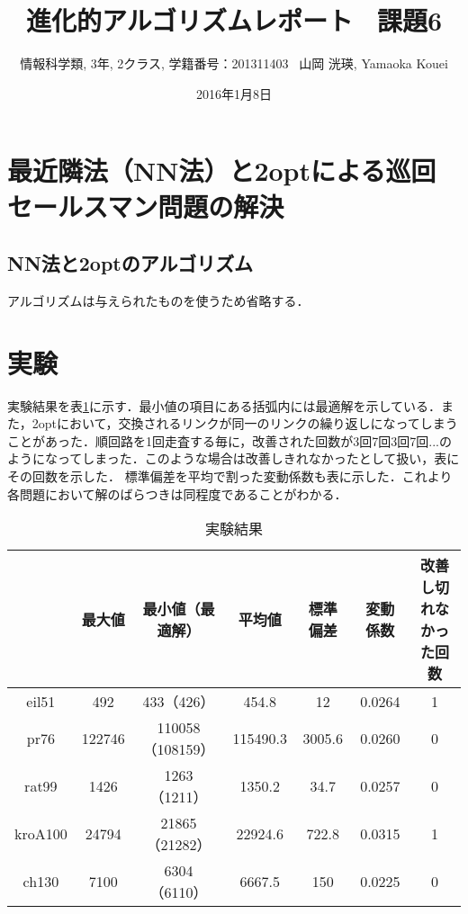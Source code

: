 \documentclass[a4j]{jarticle}
\title{進化的アルゴリズムレポート \ 課題6}
\author{情報科学類, 3年, 2クラス, 学籍番号：201311403 \ 山岡 洸瑛, Yamaoka
Kouei}
\date{2016年1月8日}
\begin{document}
\maketitle
\section*{最近隣法（NN法）と2optによる巡回セールスマン問題の解決}
\subsection*{NN法と2optのアルゴリズム}
アルゴリズムは与えられたものを使うため省略する．
\section*{実験}
実験結果を表\ref{result}に示す．最小値の項目にある括弧内には最適解を示している．また，2optにおいて，交換されるリンクが同一のリンクの繰り返しになってしまうことがあった．順回路を1回走査する毎に，改善された回数が3回7回3回7回...のようになってしまった．このような場合は改善しきれなかったとして扱い，表にその回数を示した．
標準偏差を平均で割った変動係数も表に示した．これより各問題において解のばらつきは同程度であることがわかる．
\begin{table}[H]
 \begin{center}
  \caption{実験結果}
  \label{result}
  \begin{tabular}[tb]{|c|c|c|c|c|c|c|} \hline
   & 最大値 & 最小値（最適解） & 平均値 & 標準偏差 & 変動係数 & 改善し切れなかった回数 \\ \hline
   eil51 & 492 & 433（426） & 454.8 & 12 & 0.0264 & 1 \\ \hline
   pr76 & 122746 & 110058（108159） & 115490.3 & 3005.6 & 0.0260 & 0 \\ \hline
   rat99 & 1426 & 1263（1211） & 1350.2 & 34.7 & 0.0257 & 0 \\ \hline
   kroA100 & 24794 & 21865（21282） & 22924.6 & 722.8 & 0.0315 & 1 \\ \hline
   ch130 & 7100 & 6304（6110） & 6667.5 & 150 & 0.0225 & 0 \\ \hline
  \end{tabular}
 \end{center}
\end{table}
\end{document}
